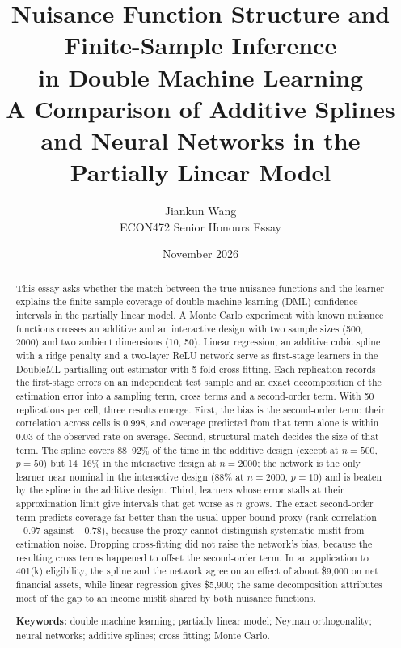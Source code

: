 \documentclass[11pt,a4paper]{article}
\title{\textbf{Nuisance Function Structure and Finite-Sample Inference\\ in Double Machine Learning}\\[0.4em]
\large A Comparison of Additive Splines and Neural Networks in the Partially Linear Model}
\author{Jiankun Wang\\ ECON472 Senior Honours Essay}
\date{November 2026}
\begin{document}
\maketitle

\begin{abstract}
\noindent This essay asks whether the match between the true nuisance functions and the learner explains the finite-sample coverage of double machine learning (DML) confidence intervals in the partially linear model. A Monte Carlo experiment with known nuisance functions crosses an additive and an interactive design with two sample sizes (500, 2000) and two ambient dimensions (10, 50). Linear regression, an additive cubic spline with a ridge penalty and a two-layer ReLU network serve as first-stage learners in the DoubleML partialling-out estimator with 5-fold cross-fitting. Each replication records the first-stage errors on an independent test sample and an exact decomposition of the estimation error into a sampling term, cross terms and a second-order term. With 50 replications per cell, three results emerge. First, the bias is the second-order term: their correlation across cells is 0.998, and coverage predicted from that term alone is within 0.03 of the observed rate on average. Second, structural match decides the size of that term. The spline covers 88--92\% of the time in the additive design (except at $n=500$, $p=50$) but 14--16\% in the interactive design at $n=2000$; the network is the only learner near nominal in the interactive design (88\% at $n=2000$, $p=10$) and is beaten by the spline in the additive design. Third, learners whose error stalls at their approximation limit give intervals that get worse as $n$ grows. The exact second-order term predicts coverage far better than the usual upper-bound proxy (rank correlation $-0.97$ against $-0.78$), because the proxy cannot distinguish systematic misfit from estimation noise. Dropping cross-fitting did not raise the network's bias, because the resulting cross terms happened to offset the second-order term. In an application to 401(k) eligibility, the spline and the network agree on an effect of about \$9,000 on net financial assets, while linear regression gives \$5,900; the same decomposition attributes most of the gap to an income misfit shared by both nuisance functions.

\medskip
\noindent\textbf{Keywords:} double machine learning; partially linear model; Neyman orthogonality; neural networks; additive splines; cross-fitting; Monte Carlo.
\end{abstract}
\end{document}
